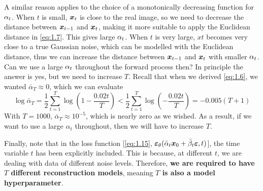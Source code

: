 A similar reason applies to  the choice of a monotonically decreasing function for $\alpha_t$. When $t$ is small, $\bm{x}_{t}$ is close to the real image, so we need to decrease the distance between $\bm{x}_{t-1}$ and $\bm{x}_{t}$, making it more suitable to apply the Euclidean distance in \cref{eq:1.7}. This gives large $\alpha_t$. When $t$ is very large, $xt$ becomes very close to a true Gaussian noise, which can be modelled with the Euclidean distance, thus we can increase the distance between $\bm{x}_{t-1}$ and $\bm{x}_{t}$ with smaller $\alpha_t$. Can we use a large $\alpha_t$ throughout the forward process then? In principle the answer is yes, but we need to increase $T$. Recall that when we derived \cref{eq:1.6}, we wanted $\bar{\alpha}_T\approx0$, which we can evaluate
\begin{equation}
    \label{eq:1.19}
    \log\bar{\alpha}_T=\frac{1}{2}\sum_{t=1}^T \log \left( 1-\frac{0.02t}{T}\right) < \frac{1}{2}\sum_{t=1}^T \log \left(-\frac{0.02t}{T}\right)=-0.005(T+1)
\end{equation}
With $T=1000$, $\bar{\alpha}_T\approx 10^{-5}$, which is nearly zero as we wished. As a result, if we want to use a large $\alpha_t$ throughout, then we will have to increase $T$.

Finally, note that in the loss function [\cref{eq:1.15}, $\bm{\varepsilon}_\theta(\bar{\alpha}_t\bm{x}_0+\bar{\beta}_t\bm{\varepsilon},t)$], the time variable $t$ has been explicitly included. This is because, at different $t$, we are dealing with data of different noise levels. Therefore, \textbf{we are required to have $T$ different reconstruction models}, meaning \textbf{$T$ is also a model hyperparameter}.